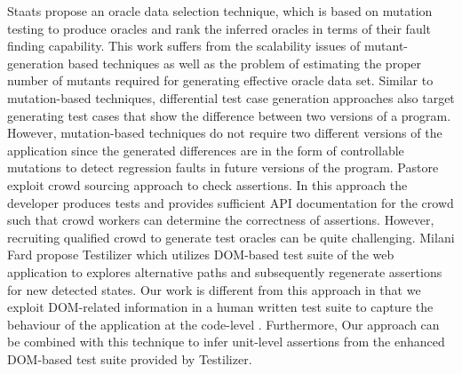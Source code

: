 Staats \etal \cite{staats:icse12} propose an oracle data selection technique, which is based on mutation testing to produce oracles and rank the inferred oracles in terms of their fault finding capability. This work suffers from the scalability issues of mutant-generation based techniques as well as the problem of estimating the proper number of mutants required for generating effective oracle data set.
Similar to mutation-based techniques, differential test case generation approaches \cite{taneja:ase08, elbaum:tse09} also target generating test cases that show the difference between two versions of a program. However, mutation-based techniques do not require two different versions of the application since the generated differences are in the form of controllable mutations to detect regression faults in future versions of the program.
Pastore \etal \cite{pastore:icst13} exploit crowd sourcing approach to check assertions. In this approach the developer produces tests and provides sufficient API documentation for the crowd such that crowd workers can determine the correctness of assertions. However, recruiting qualified crowd to generate test oracles can be quite challenging.
Milani Fard \etal \cite{milanifard:ase14} propose Testilizer which utilizes DOM-based test suite of the web application to explores alternative paths and subsequently regenerate assertions for new detected states. Our work is different from this approach in that we exploit DOM-related information in a human written test suite to capture the behaviour of the application at the code-level \javascript. Furthermore, Our approach can be combined with this technique to infer unit-level \javascript assertions from the enhanced DOM-based test suite provided by Testilizer.  
  


